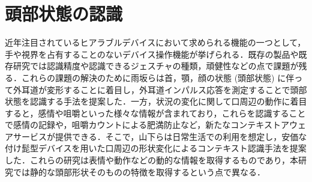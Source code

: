 \section{頭部状態の認識}
近年注目されているヒアラブルデバイスにおいて求められる機能の一つとして，手や視界を占有することのないデバイス操作機能が挙げられる．既存の製品や既存研究では認識精度や認識できるジェスチャの種類，頑健性などの点で課題が残る．これらの課題の解決のために雨坂ら\cite{ear}は首，顎，顔の状態 (頭部状態) に伴って外耳道が変形することに着目し，外耳道インパルス応答を測定することで頭部状態を認識する手法を提案した．一方，状況の変化に関して口周辺の動作に着目すると，感情や咀嚼といった様々な情報が含まれており，これらを認識することで感情の記録や，咀嚼カウントによる肥満防止など，新たなコンテキストアウェアサービスが提供できる．そこで，山下ら\cite{mouth}は日常生活での利用を想定し，安価な付け髭型デバイスを用いた口周辺の形状変化によるコンテキスト認識手法を提案した．これらの研究は表情や動作などの動的な情報を取得するものであり，本研究では静的な頭部形状そのものの特徴を取得するという点で異なる．